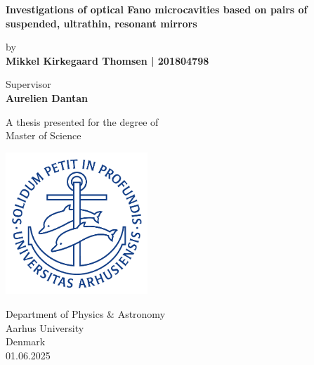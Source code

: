 \begin{titlepage}
    \begin{center}
        \huge{\textbf{Investigations of optical Fano microcavities based on pairs of suspended, ultrathin, resonant mirrors}}
 
        \vspace{0.5cm}
        \large
        by\\
        \vspace{0.5cm}
        \textbf{Mikkel Kirkegaard Thomsen | 201804798}
 
        \vspace{0.5cm}
        Supervisor\\
        \textbf{Aurelien Dantan}
 
        \vfill
 
        \large     
        A thesis presented for the degree of\\
        Master of Science
             
        \vspace{0.5cm}
      
        \includegraphics[width=0.4\textwidth]{figures/au_logo.png}
        
        \large     
        Department of Physics \& Astronomy\\
        Aarhus University\\
        Denmark\\
        01.06.2025\\
    \end{center}
 \end{titlepage}
